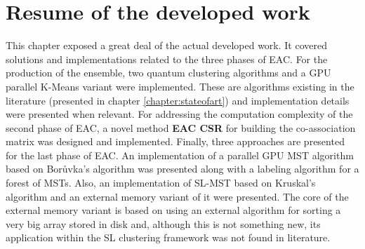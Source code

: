 \section{Resume of the developed work}

This chapter exposed a great deal of the actual developed work.
It covered solutions and implementations related to the three phases of EAC.
For the production of the ensemble, two quantum clustering algorithms and a GPU parallel K-Means variant were implemented.
These are algorithms existing in the literature (presented in chapter \ref{chapter:stateofart}) and implementation details were presented when relevant.
For addressing the computation complexity of the second phase of EAC, a novel method \textbf{EAC CSR} for building the co-association matrix was designed and implemented.
Finally, three approaches are presented for the last phase of EAC.
An implementation of a parallel GPU MST algorithm based on Borůvka's algorithm was presented along with a labeling algorithm for a forest of MSTs.
Also, an implementation of SL-MST based on Kruskal's algorithm and an external memory variant of it were presented.
The core of the external memory variant is based on using an external algorithm for sorting a very big array stored in disk and, although this is not something new, its application within the SL clustering framework was not found in literature.





